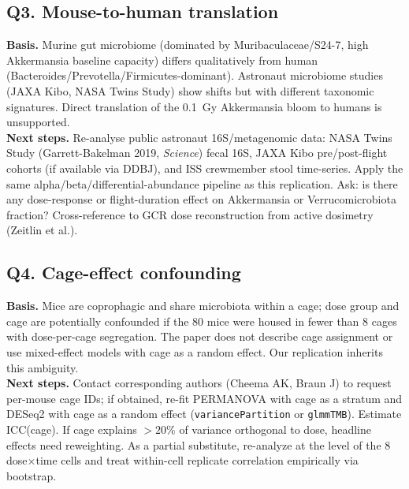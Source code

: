 \subsection*{Q3. Mouse-to-human translation}
\textbf{Basis.} Murine gut microbiome (dominated by Muribaculaceae/S24-7, high Akkermansia baseline capacity) differs qualitatively from human (Bacteroides/Prevotella/Firmicutes-dominant). Astronaut microbiome studies (JAXA Kibo, NASA Twins Study) show shifts but with different taxonomic signatures. Direct translation of the 0.1~Gy Akkermansia bloom to humans is unsupported. \\
\textbf{Next steps.} Re-analyse public astronaut 16S/metagenomic data: NASA Twins Study (Garrett-Bakelman 2019, \emph{Science}) fecal 16S, JAXA Kibo pre/post-flight cohorts (if available via DDBJ), and ISS crewmember stool time-series. Apply the same alpha/beta/differential-abundance pipeline as this replication. Ask: is there any dose-response or flight-duration effect on Akkermansia or Verrucomicrobiota fraction? Cross-reference to GCR dose reconstruction from active dosimetry (Zeitlin et al.).

\subsection*{Q4. Cage-effect confounding}
\textbf{Basis.} Mice are coprophagic and share microbiota within a cage; dose group and cage are potentially confounded if the 80 mice were housed in fewer than 8 cages with dose-per-cage segregation. The paper does not describe cage assignment or use mixed-effect models with cage as a random effect. Our replication inherits this ambiguity. \\
\textbf{Next steps.} Contact corresponding authors (Cheema AK, Braun J) to request per-mouse cage IDs; if obtained, re-fit PERMANOVA with cage as a stratum and DESeq2 with cage as a random effect (\texttt{variancePartition} or \texttt{glmmTMB}). Estimate ICC(cage). If cage explains $>20\%$ of variance orthogonal to dose, headline effects need reweighting. As a partial substitute, re-analyze at the level of the 8 dose$\times$time cells and treat within-cell replicate correlation empirically via bootstrap.


